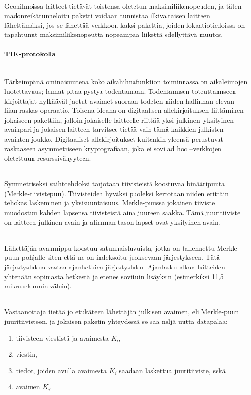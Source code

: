 \documentclass[finnish]{tktltiki2}
\theoremstyle{definition}
\theoremstyle{remark}
\begin{document}
\noindent \\
Geohihnoissa laitteet tietävät toistensa oletetun maksimiliikenopeuden, ja täten madonreikätunneloitu paketti voidaan tunnistaa ilkivaltaisen laitteen lähettämäksi, jos se lähettää verkkoon kaksi pakettia, joiden lokaatiotiedoissa on tapahtunut maksimiliikenopeutta nopeampaa liikettä edellyttävä muutos.

\paragraph{TIK-protokolla} 
\label{tik}
\noindent \\
Tärkeimpänä ominaisuutena koko aikahihnafunktion toiminnassa on aikaleimojen luotettavuus; leimat pitää pystyä todentamaan. Todentamisen toteuttamiseen kirjoittajat hylkäävät jaetut avaimet suoraan todeten niiden hallinnan olevan liian raskas operaatio. Toisena ideana on digitaalisen allekirjoituksen liittäminen jokaiseen pakettiin, jolloin jokaiselle laitteelle riittää yksi julkinen--yksityinen-avainpari ja jokaisen laitteen tarvitsee tietää vain tämä kaikkien julkisten avainten joukko. Digitaaliset allekirjoitukset kuitenkin yleensä perustuvat raskaaseen asymmetriseen kryptografiaan, joka ei sovi ad hoc –verkkojen oletettuun resurssivähyyteen.

\noindent \\
Symmetriseksi vaihtoehdoksi tarjotaan tiivisteistä koostuvaa binääripuuta (Merkle-tiivistepuu). Tiivisteiden hyväksi puoleksi kerrotaan niiden erittäin tehokas laskeminen ja yksisuuntaisuus. Merkle-puussa jokainen tiiviste muodostuu kahden lapsensa tiivisteistä aina juureen saakka. Tämä juuritiiviste on laitteen julkinen avain ja alimman tason lapset ovat yksityinen avain.

\noindent \\
Lähettäjän avainnippu koostuu satunnaisluvuista, jotka on tallennettu Merkle-puun pohjalle siten että ne on indeksoitu juoksevaan järjestykseen. Tätä järjestyslukua vastaa ajanhetkien järjestysluku. Ajanlasku alkaa laitteiden yhtenään sopimasta hetkestä ja etenee sovituin lisäyksin (esimerkiksi 11,5 mikrosekunnin välein). 

\noindent \\
Vastaanottaja tietää jo etukäteen lähettäjän julkisen avaimen, eli Merkle-puun juuritiivisteen, ja jokaisen paketin yhteydessä se saa neljä uutta datapalaa:

\begin{enumerate}
\item tiivisteen viestistä ja avaimesta $K_i$,
\item viestin,
\item tiedot, joiden avulla avaimesta $K_i$ saadaan laskettua juuritiiviste, sekä
\item avaimen $K_i$.
\end{enumerate}
\end{document}
